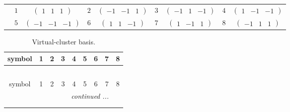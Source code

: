 \documentclass[fleqn,10pt,landscape]{article}
\begin{document}
\begin{itemize}
{\begin{center}
\begin{longtable}{ccccccccc}
 & $ 1 $ & $ \begin{pmatrix} 1 & 1 & 1 \end{pmatrix} $ & $ 2 $ & $ \begin{pmatrix} -1 & -1 & 1 \end{pmatrix} $ & $ 3 $ & $ \begin{pmatrix} -1 & 1 & -1 \end{pmatrix} $ & $ 4 $ & $ \begin{pmatrix} 1 & -1 & -1 \end{pmatrix} $ \\
& $ 5 $ & $ \begin{pmatrix} -1 & -1 & -1 \end{pmatrix} $ & $ 6 $ & $ \begin{pmatrix} 1 & 1 & -1 \end{pmatrix} $ & $ 7 $ & $ \begin{pmatrix} 1 & -1 & 1 \end{pmatrix} $ & $ 8 $ & $ \begin{pmatrix} -1 & 1 & 1 \end{pmatrix} $ \\
\end{longtable}
\end{center}
\begin{center}
\renewcommand{\arraystretch}{1.7}
\begin{longtable}{ccccccccc}
\caption{Virtual-cluster basis.}
 \\
 \hline \hline
symbol & 1 & 2 & 3 & 4 & 5 & 6 & 7 & 8 \\ \hline \endfirsthead

\multicolumn{8}{l}{\tablename\ \thetable{}} \\
 \hline \hline
symbol & 1 & 2 & 3 & 4 & 5 & 6 & 7 & 8 \\ \hline \endhead

 \hline \hline
\multicolumn{8}{r}{\footnotesize\it continued ...} \\ \endfoot

 \hline \hline
\multicolumn{8}{r}{} \\ \endlastfoot


\end{longtable}
\end{center}}
\end{itemize}
\end{document}
